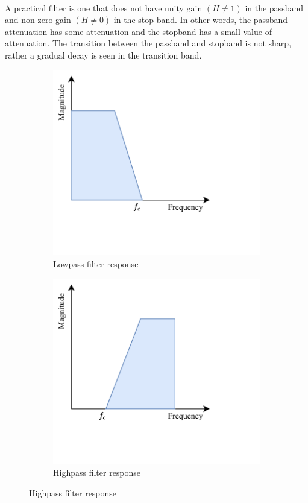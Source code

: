 \\A practical filter is one that does not have unity gain $(H\neq1)$ in the passband and non-zero gain $(H\neq0)$ in the stop band. In other words, the passband attenuation has some attenuation and the stopband has a small value of attenuation. The transition between the passband and stopband is not sharp, rather a gradual decay is seen in the transition band.
\begin{figure}[H]
    \begin{subfigure}{0.48\textwidth}
        \centering
        \includegraphics[width=0.7\linewidth]{../Figures/practical_lp}
        \caption{Lowpass filter response}
        \label{fig:practical-a}
    \end{subfigure}
    \begin{subfigure}{0.48\textwidth}
        \centering
        \includegraphics[width=0.7\linewidth]{../Figures/practical_hp}
        \caption{Highpass filter response}
        \label{fig:practical-b}
    \end{subfigure}\newline

\end{figure}
